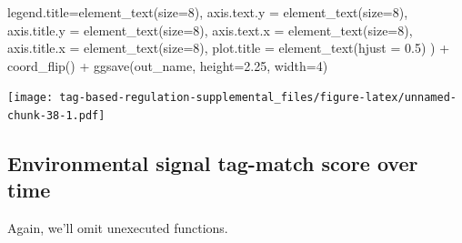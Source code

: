 \documentclass[
]{book}
\newenvironment{Shaded}{\begin{snugshade}}{\end{snugshade}}
\newcommand{\AttributeTok}[1]{\textcolor[rgb]{0.77,0.63,0.00}{#1}}
\newcommand{\DecValTok}[1]{\textcolor[rgb]{0.00,0.00,0.81}{#1}}
\newcommand{\FloatTok}[1]{\textcolor[rgb]{0.00,0.00,0.81}{#1}}
\newcommand{\FunctionTok}[1]{\textcolor[rgb]{0.00,0.00,0.00}{#1}}
\newcommand{\NormalTok}[1]{#1}
\newcommand{\SpecialCharTok}[1]{\textcolor[rgb]{0.00,0.00,0.00}{#1}}
\begin{document}
\begin{Shaded}
\begin{Highlighting}[]
    \AttributeTok{legend.title=}\FunctionTok{element\_text}\NormalTok{(}\AttributeTok{size=}\DecValTok{8}\NormalTok{),}
    \AttributeTok{axis.text.y =} \FunctionTok{element\_text}\NormalTok{(}\AttributeTok{size=}\DecValTok{8}\NormalTok{),}
    \AttributeTok{axis.title.y =} \FunctionTok{element\_text}\NormalTok{(}\AttributeTok{size=}\DecValTok{8}\NormalTok{),}
    \AttributeTok{axis.text.x =} \FunctionTok{element\_text}\NormalTok{(}\AttributeTok{size=}\DecValTok{8}\NormalTok{),}
    \AttributeTok{axis.title.x =} \FunctionTok{element\_text}\NormalTok{(}\AttributeTok{size=}\DecValTok{8}\NormalTok{),}
    \AttributeTok{plot.title =} \FunctionTok{element\_text}\NormalTok{(}\AttributeTok{hjust =} \FloatTok{0.5}\NormalTok{)}
\NormalTok{  ) }\SpecialCharTok{+}
  \FunctionTok{coord\_flip}\NormalTok{() }\SpecialCharTok{+}
  \FunctionTok{ggsave}\NormalTok{(out\_name, }\AttributeTok{height=}\FloatTok{2.25}\NormalTok{, }\AttributeTok{width=}\DecValTok{4}\NormalTok{)}
\end{Highlighting}
\end{Shaded}

\texttt{[image: tag-based-regulation-supplemental\_files/figure-latex/unnamed-chunk-38-1.pdf]}

\hypertarget{environmental-signal-tag-match-score-over-time}{%
\subsection{Environmental signal tag-match score over time}\label{environmental-signal-tag-match-score-over-time}}

Again, we'll omit unexecuted functions.
\end{document}

